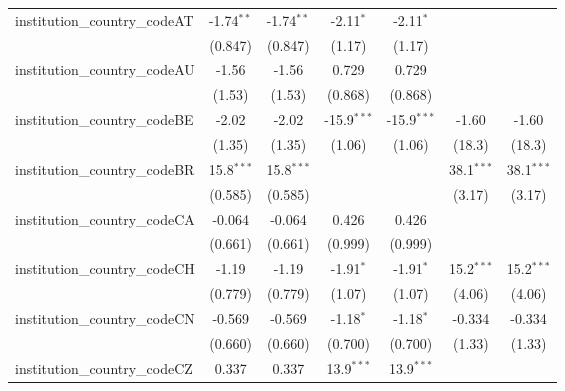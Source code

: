 \begin{tabular}{lcccccc}
   institution\_country\_codeAT          & -1.74$^{**}$  & -1.74$^{**}$  & -2.11$^{*}$   & -2.11$^{*}$   &               &   \\   
                                         & (0.847)       & (0.847)       & (1.17)        & (1.17)        &               &   \\   
   institution\_country\_codeAU          & -1.56         & -1.56         & 0.729         & 0.729         &               &   \\   
                                         & (1.53)        & (1.53)        & (0.868)       & (0.868)       &               &   \\   
   institution\_country\_codeBE          & -2.02         & -2.02         & -15.9$^{***}$ & -15.9$^{***}$ & -1.60         & -1.60\\   
                                         & (1.35)        & (1.35)        & (1.06)        & (1.06)        & (18.3)        & (18.3)\\   
   institution\_country\_codeBR          & 15.8$^{***}$  & 15.8$^{***}$  &               &               & 38.1$^{***}$  & 38.1$^{***}$\\   
                                         & (0.585)       & (0.585)       &               &               & (3.17)        & (3.17)\\   
   institution\_country\_codeCA          & -0.064        & -0.064        & 0.426         & 0.426         &               &   \\   
                                         & (0.661)       & (0.661)       & (0.999)       & (0.999)       &               &   \\   
   institution\_country\_codeCH          & -1.19         & -1.19         & -1.91$^{*}$   & -1.91$^{*}$   & 15.2$^{***}$  & 15.2$^{***}$\\   
                                         & (0.779)       & (0.779)       & (1.07)        & (1.07)        & (4.06)        & (4.06)\\   
   institution\_country\_codeCN          & -0.569        & -0.569        & -1.18$^{*}$   & -1.18$^{*}$   & -0.334        & -0.334\\   
                                         & (0.660)       & (0.660)       & (0.700)       & (0.700)       & (1.33)        & (1.33)\\   
   institution\_country\_codeCZ          & 0.337         & 0.337         & 13.9$^{***}$  & 13.9$^{***}$  &               &   \\   

\end{tabular}
